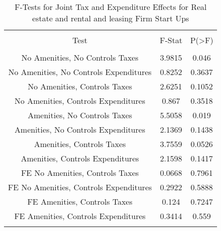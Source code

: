 
\begin{table}[!htbp] \centering 
  \caption{F-Tests for Joint Tax and Expenditure Effects for Real estate and rental and leasing Firm Start Ups} 
  \label{53Ftests} 
\begin{tabular}{@{\extracolsep{5pt}} ccc} 
\\[-1.8ex]\hline 
\hline \\[-1.8ex] 
Test & F-Stat & P(\textgreater F) \\ 
\hline \\[-1.8ex] 
No Amenities, No Controls Taxes & 3.9815 & 0.046 \\ 
No Amenities, No Controls Expenditures & 0.8252 & 0.3637 \\ 
No Amenities, Controls Taxes & 2.6251 & 0.1052 \\ 
No Amenities, Controls Expenditures & 0.867 & 0.3518 \\ 
Amenities, No Controls Taxes & 5.5058 & 0.019 \\ 
Amenities, No Controls Expenditures & 2.1369 & 0.1438 \\ 
Amenities, Controls Taxes & 3.7559 & 0.0526 \\ 
Amenities, Controls Expenditures & 2.1598 & 0.1417 \\ 
FE No Amenities, Controls Taxes & 0.0668 & 0.7961 \\ 
FE No Amenities, Controls Expenditures & 0.2922 & 0.5888 \\ 
FE Amenities, Controls Taxes & 0.124 & 0.7247 \\ 
FE Amenities, Controls Expenditures & 0.3414 & 0.559 \\ 
\hline \\[-1.8ex] 
\end{tabular} 
\end{table} 
